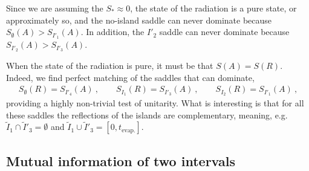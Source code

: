 \documentclass[12pt]{article}
\newcommand{\EQ}[1]{\begin{equation}\begin{split} #1
\end{split}\end{equation}}
\begin{document}
Since we are assuming the $S_*\approx0$, the state of the radiation is a pure state, or approximately so, and the no-island saddle can never dominate because $S_\emptyset(A)>S_{I'_1}(A)$. In addition, the $I'_2$ saddle can never dominate because $S_{I'_2}(A)>S_{I'_3}(A)$. 

When the state of the  radiation is pure, it must be that $S(A)=S(R)$. Indeed, we find perfect matching of the saddles that can dominate,
\EQ{
S_\emptyset(R)=S_{I'_4}(A)\  ,\qquad S_{I_1}(R)=S_{I'_3}(A)\ ,\qquad S_{I_2}(R)=S_{I'_1}(A)\ ,
}
providing a highly non-trivial test of unitarity. What is interesting is that for all these saddles the reflections of the islands are complementary, meaning, e.g.~$\tilde I_1\cap\tilde I'_3=\emptyset$ and $\tilde  I_1\cup \tilde I'_3=[0,t_\text{evap.}]$.
 
\subsection{Mutual information of two intervals}
\label{sub:mutual_inf}
\end{document}

